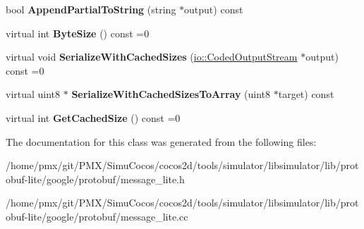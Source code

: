 \begin{DoxyCompactItemize}
\item 
\mbox{\label{classgoogle_1_1protobuf_1_1MessageLite_a21a9f415a1fd3db0c4d9d2952bcab180}} 
bool {\bfseries Append\+Partial\+To\+String} (string $\ast$output) const
\item 
\mbox{\label{classgoogle_1_1protobuf_1_1MessageLite_af5cc808aa57b93801b1141e7dbe1f006}} 
virtual int {\bfseries Byte\+Size} () const =0
\item 
\mbox{\label{classgoogle_1_1protobuf_1_1MessageLite_acdb63663d2f0be89b34066bdf35de207}} 
virtual void {\bfseries Serialize\+With\+Cached\+Sizes} (\hyperlink{classgoogle_1_1protobuf_1_1io_1_1CodedOutputStream}{io\+::\+Coded\+Output\+Stream} $\ast$output) const =0
\item 
\mbox{\label{classgoogle_1_1protobuf_1_1MessageLite_a9b7975ef6b08e887d1bcc5eef23e3979}} 
virtual uint8 $\ast$ {\bfseries Serialize\+With\+Cached\+Sizes\+To\+Array} (uint8 $\ast$target) const
\item 
\mbox{\label{classgoogle_1_1protobuf_1_1MessageLite_a5347f639af70b2f2ba4963791931404e}} 
virtual int {\bfseries Get\+Cached\+Size} () const =0
\end{DoxyCompactItemize}


The documentation for this class was generated from the following files\+:\begin{DoxyCompactItemize}
\item 
/home/pmx/git/\+P\+M\+X/\+Simu\+Cocos/cocos2d/tools/simulator/libsimulator/lib/protobuf-\/lite/google/protobuf/message\+\_\+lite.\+h\item 
/home/pmx/git/\+P\+M\+X/\+Simu\+Cocos/cocos2d/tools/simulator/libsimulator/lib/protobuf-\/lite/google/protobuf/message\+\_\+lite.\+cc\end{DoxyCompactItemize}

